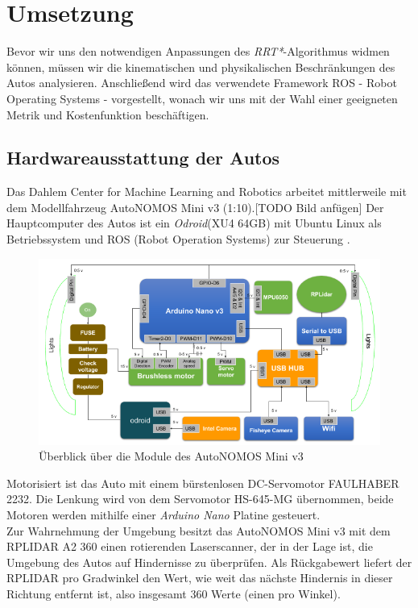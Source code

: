\section{Umsetzung}
\label{sec:Umsetzung}
Bevor wir uns den notwendigen Anpassungen des \textit{RRT*}-Algorithmus widmen können, müssen wir die kinematischen und physikalischen Beschränkungen des Autos analysieren. Anschließend wird das verwendete Framework ROS - Robot Operating Systems - vorgestellt, wonach wir uns mit der Wahl einer geeigneten Metrik und Kostenfunktion beschäftigen.
\subsection{Hardwareausstattung der Autos}
Das Dahlem Center for Machine Learning and Robotics arbeitet mittlerweile mit dem Modellfahrzeug AutoNOMOS Mini v3 (1:10).[TODO Bild anfügen] Der Hauptcomputer des Autos ist ein \textit{Odroid}(XU4 64GB) mit Ubuntu Linux als Betriebssystem und ROS (Robot Operation Systems) zur Steuerung \citep{fubAuto}.\\
\begin{figure}
\centering
\includegraphics[scale=0.8]{Bilder/AutoNOMOS_mini_v3.png} 
\caption{Überblick über die Module des AutoNOMOS Mini v3}
\end{figure}
Motorisiert ist das Auto mit einem bürstenlosen DC-Servomotor FAULHABER 2232. Die Lenkung wird von dem Servomotor HS-645-MG übernommen, beide Motoren werden mithilfe einer \textit{Arduino Nano} Platine gesteuert. \\
Zur Wahrnehmung der Umgebung besitzt das AutoNOMOS Mini v3 mit dem RPLIDAR A2 360 einen rotierenden Laserscanner, der in der Lage ist, die Umgebung des Autos auf Hindernisse zu überprüfen. Als Rückgabewert liefert der RPLIDAR pro Gradwinkel den Wert, wie weit das nächste Hindernis in dieser Richtung entfernt ist, also insgesamt 360 Werte (einen pro Winkel). \\
